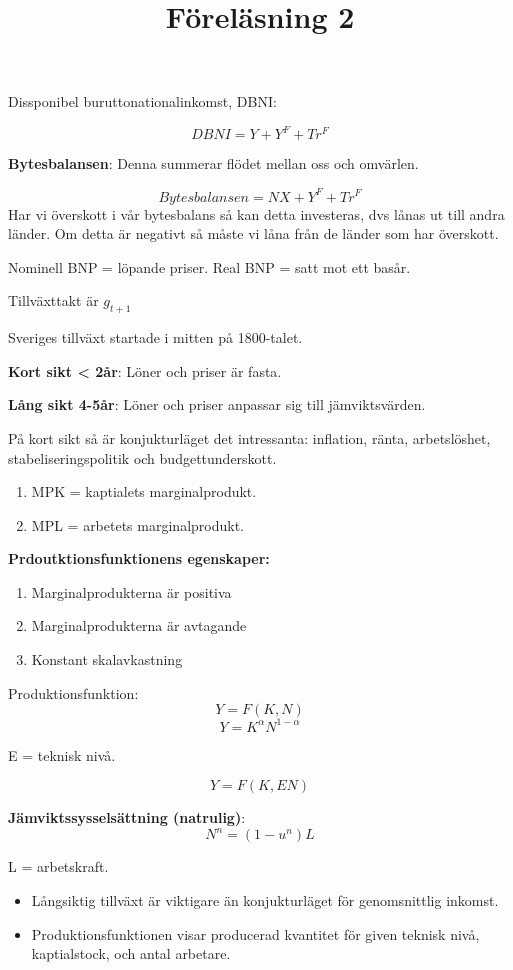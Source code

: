 \documentclass{article}
\begin{document}
Dissponibel buruttonationalinkomst, DBNI: 

$$
DBNI = Y + Y^F + Tr^F 
$$


\textbf{Bytesbalansen}: Denna summerar flödet mellan oss och omvärlen. 

$$
Bytesbalansen = NX + Y^F + Tr^F
$$
Har vi överskott i vår bytesbalans så kan detta investeras, dvs lånas ut till andra länder. Om detta är negativt så måste vi låna från de länder som har överskott. 


Nominell BNP = löpande priser.
Real BNP = satt mot ett basår. 
\par \noindent
Tillväxttakt är $g_{t+1}$

\vspace{5mm}


\title{Föreläsning 2}
\vspace{5mm}\par

Sveriges tillväxt startade i mitten på 1800-talet. 

\textbf{Kort sikt < 2år}: Löner och priser är fasta. 

\textbf{Lång sikt 4-5år}: Löner och priser anpassar sig till jämviktsvärden. 

På kort sikt så är konjukturläget det intressanta: inflation, ränta, arbetslöshet, stabeliseringspolitik och budgettunderskott. 

\begin{enumerate}
 \item MPK = kaptialets marginalprodukt. 
 \item MPL = arbetets marginalprodukt. 
\end{enumerate}

\textbf{Prdoutktionsfunktionens egenskaper:}
\begin{enumerate}
 \item Marginalprodukterna är positiva
 \item Marginalprodukterna är avtagande
 \item Konstant skalavkastning
\end{enumerate}

Produktionsfunktion: $$ Y = F(K,N) $$
$$ Y = K^{\alpha}N^{1-\alpha}$$

E = teknisk nivå. 

$$ Y = F(K,EN)$$

\textbf{Jämviktssysselsättning (natrulig)}:
$$N^n = (1-u^n)L $$

L = arbetskraft. 

\begin{itemize}
    \item Långsiktig tillväxt är viktigare än konjukturläget för genomsnittlig inkomst.
    \item Produktionsfunktionen visar producerad kvantitet för given teknisk nivå, kaptialstock, och antal arbetare. 
\end{itemize}
\end{document}
